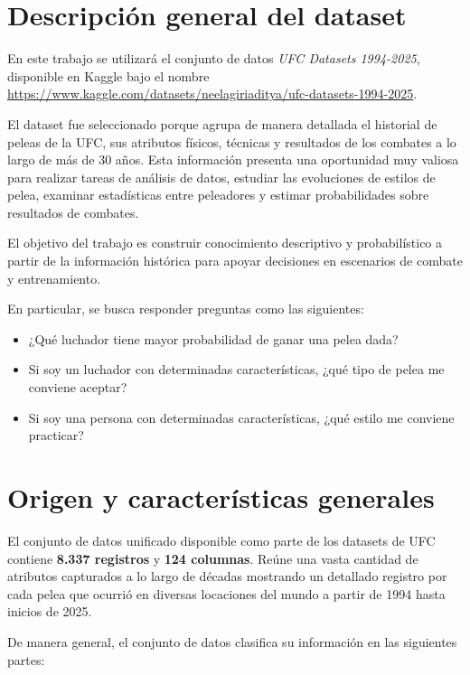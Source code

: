 \documentclass[11pt,a4paper]{article}
\begin{document}
\pagebreak
\section{Descripción general del dataset}

En este trabajo se utilizará el conjunto de datos \textit{UFC Datasets 1994-2025}, disponible en Kaggle bajo el nombre \url{https://www.kaggle.com/datasets/neelagiriaditya/ufc-datasets-1994-2025}.

El dataset fue seleccionado porque agrupa de manera detallada el historial de peleas de la UFC, sus atributos físicos, técnicas y resultados de los combates a lo largo de más de 30 años. Esta información presenta una oportunidad muy valiosa para realizar tareas de análisis de datos, estudiar las evoluciones de estilos de pelea, examinar estadísticas entre peleadores y estimar probabilidades sobre resultados de combates.

El objetivo del trabajo es construir conocimiento descriptivo y probabilístico a partir de la información histórica para apoyar decisiones en escenarios de combate y entrenamiento.

En particular, se busca responder preguntas como las siguientes:

\begin{itemize}[leftmargin=*]
\item ¿Qué luchador tiene mayor probabilidad de ganar una pelea dada?
\item Si soy un luchador con determinadas características, ¿qué tipo de pelea me conviene aceptar?
\item Si soy una persona con determinadas características, ¿qué estilo me conviene practicar?
\end{itemize}

\pagebreak
\section{Origen y características generales}

El conjunto de datos unificado  disponible como parte de los datasets de UFC contiene \textbf{8.337 registros} y \textbf{124 columnas}. Reúne una vasta cantidad de atributos capturados a lo largo de décadas mostrando un detallado registro por cada pelea que ocurrió en diversas locaciones del mundo a partir de 1994 hasta inicios de 2025. 

De manera general, el conjunto de datos clasifica su información en las siguientes partes:
\end{document}
